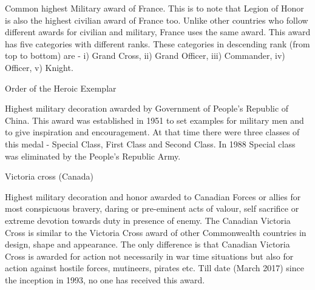 \documentclass[
  openany]{book}
\begin{document}
Common highest Military award of France. This is to note that Legion of Honor is also the highest civilian award of France too. Unlike other countries who follow different awards for civilian and military, France uses the same award. This award has five categories with different ranks. These categories in descending rank (from top to bottom) are - i) Grand Cross, ii) Grand Officer, iii) Commander, iv) Officer, v) Knight.

Order of the Heroic Exemplar

Highest military decoration awarded by Government of People's Republic of China. This award was established in 1951 to set examples for military men and to give inspiration and encouragement. At that time there were three classes of this medal - Special Class, First Class and Second Class. In 1988 Special class was eliminated by the People's Republic Army.

Victoria cross (Canada)

Highest military decoration and honor awarded to Canadian Forces or allies for most conspicuous bravery, daring or pre-eminent acts of valour, self sacrifice or extreme devotion towards duty in presence of enemy. The Canadian Victoria Cross is similar to the Victoria Cross award of other Commonwealth countries in design, shape and appearance. The only difference is that Canadian Victoria Cross is awarded for action not necessarily in war time situations but also for action against hostile forces, mutineers, pirates etc. Till date (March 2017) since the inception in 1993, no one has received this award.
\end{document}
